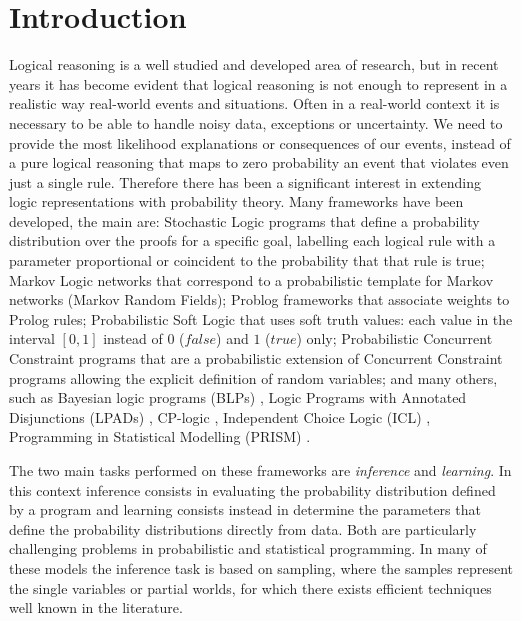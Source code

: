 \documentclass[letterpaper]{article}
\theoremstyle{plain}
\theoremstyle{definition}
\theoremstyle{remark}
\theoremstyle{definition}
\begin{document}

\section{Introduction}
Logical reasoning is a well studied and developed area of research, but in recent years it has become evident that logical reasoning is not enough to represent in a realistic way real-world events and situations. Often in a real-world context it is necessary to be able to handle noisy data, exceptions or uncertainty. We need to provide the most likelihood explanations or consequences of our events, instead of a pure logical reasoning that maps to zero probability an event that violates even just a single rule.
Therefore there has been a significant interest in extending logic representations with probability theory. 
Many frameworks have been developed, the main are:
Stochastic Logic programs \cite{SLPmuggleton96,SLPcussens2000} that define a probability distribution over the proofs for a specific goal, labelling each logical rule with a parameter proportional or coincident to the probability that that rule is true;
Markov Logic networks  \cite{markovLogicNetworks} that correspond to a probabilistic template for Markov networks (Markov Random Fields);
Problog frameworks \cite{ProbLog_original} that associate weights to Prolog rules;
Probabilistic Soft Logic  \cite{ProbSoftLogic} that uses soft truth values: each value in the interval $[0, 1] $ instead of $0$ ($false$) and $1$ ($true$) only;
Probabilistic Concurrent Constraint programs \cite{PCC} that are a probabilistic extension of Concurrent Constraint programs allowing the explicit definition of random variables;
and many others, such as 
Bayesian logic programs (BLPs)  \cite{LogicBN,LogicBN_1},
Logic Programs with Annotated Disjunctions (LPADs) \cite{annotatedDisjunctions}, 
CP-logic \cite{CP-logic}, 
Independent Choice Logic (ICL) \cite{IndipendentChoiceLogic93,IndipendentChoiceLogic97}, 
Programming in Statistical Modelling (PRISM) \cite{PRISM95,PRISM2001}.



The two main tasks performed on these frameworks are \emph{inference} and \emph{learning}. In this context inference consists in evaluating the probability distribution defined by a program and learning consists instead in determine the parameters that define the probability distributions directly from data. Both are particularly challenging problems in probabilistic and statistical programming.
In many of these models the inference task is based on sampling, where the samples represent the single variables or partial worlds, for which there exists efficient techniques well known in the literature.
\end{document}
